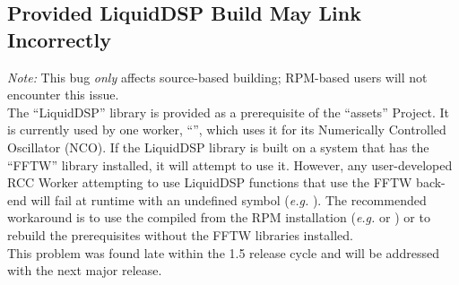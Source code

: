 \subsection{Provided LiquidDSP Build May Link Incorrectly} %
\label{bug:5543}
\textit{Note:} This bug \textit{only} affects source-based building; RPM-based users will not encounter this issue.\\

The ``LiquidDSP'' library is provided as a prerequisite of the ``assets'' Project.
It is currently used by one worker, ``'', which uses it for its Numerically Controlled Oscillator (NCO).
If the LiquidDSP library is built on a system that has the ``FFTW'' library installed, it will attempt to use it.
However, any user-developed RCC Worker attempting to use LiquidDSP functions that use the FFTW back-end will fail at runtime with an undefined symbol (\textit{e.g.} ).
The recommended workaround is to use the compiled  from the RPM installation (\textit{e.g.}  or ) or to rebuild the prerequisites without the FFTW libraries installed.\\

This problem was found late within the 1.5 release cycle and will be addressed with the next major release.

\iffalse %
\subsection{``python3'' Symlink Missing} %
\label{bug:5477}
Some ``python3'' RPMs do not provide a default symlink from \path{/usr/bin/python3} to their proper executable\footnote{For example, CentOS~7's \path{python34-3.4.10-1.el7.x86_64} does not, while the slightly-older \path{3.4.9-2.el7.x86_64} did.}.
This is not considered a deficiency of the framework itself, but the Python packager.
If your system does not have \path{/usr/bin/python3}, a system administrator needs to create one for you pointing to your installation of Python3, \textit{e.g.} ``\code{cd /usr/bin; sudo ln -s python3.4 python3}'' for Python 3.4.
The \path{opencpi-devel} RPM works around this by installing a symlink, but non-RPM users \textit{may} need to manually create the symlink.
\fi

